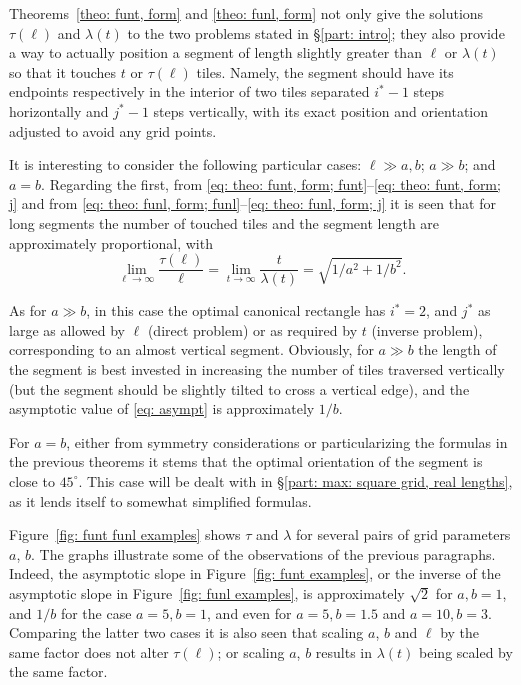\documentclass[12pt, a4paper]{article}
\newcommand{\funt}{\tau} %
\newcommand{\funl}{\lambda} %
\newcommand{\len}{\ell} %
\newcommand{\tiles}{t} %
\newcommand{\isoli}{i^\ast}
\newcommand{\jsoli}{j^\ast}
\begin{document}
Theorems~\ref{theo: funt, form} and \ref{theo: funl, form} not only give the solutions $\funt(\len)$ and $\funl(\tiles)$ to the two problems stated in \S\ref{part: intro}; they also provide a way to actually position a segment of length slightly greater than $\len$ or $\funl(\tiles)$ so that it touches $\tiles$ or $\funt(\len)$ tiles. Namely, the segment should have its endpoints respectively in the interior of two tiles separated $\isoli-1$ steps horizontally and $\jsoli-1$ steps vertically, with its exact position and orientation  adjusted to avoid any grid points.

It is interesting to consider the following particular cases: $\len \gg a,b$; $a \gg b$; and $a=b$. Regarding the first, from \eqref{eq: theo: funt, form; funt}--\eqref{eq: theo: funt, form; j}
and from \eqref{eq: theo: funl, form; funl}--\eqref{eq: theo: funl, form; j}
it is seen that for long segments the number of touched tiles and the segment length are approximately proportional, with
\begin{equation}
\label{eq: asympt}
\lim_{\len \rightarrow \infty} \frac{\funt(\len)}{\len}
= \lim_{\tiles \rightarrow \infty} \frac{\tiles}{\funl(\tiles)}
= \sqrt{1/a^2 + 1/b^2}.
\end{equation}

As for $a \gg b$, in this case the optimal canonical rectangle has $\isoli = 2$, and $\jsoli$ as large as allowed by $\len$ (direct problem) or as required by $\tiles$ (inverse problem), corresponding to an almost vertical segment. Obviously, for $a \gg b$ the length of the segment is best invested in increasing the number of tiles traversed vertically (but the segment should be slightly tilted to cross a vertical edge), and the asymptotic value of \eqref{eq: asympt} is approximately $1/b$.

For $a=b$, either from symmetry considerations or particularizing the formulas in the previous theorems it stems that the optimal orientation of the segment is close to $45^\circ$. This case will be dealt with in \S\ref{part: max: square grid, real lengths}, as it lends itself to somewhat simplified formulas.

Figure~\ref{fig: funt funl examples} shows $\funt$ and $\funl$ for several pairs of grid parameters $a$, $b$. The graphs illustrate some of the observations of the previous paragraphs. Indeed, the asymptotic slope in Figure~\ref{fig: funt examples}, or the inverse of the asymptotic slope in Figure~\ref{fig: funl examples}, is approximately $\sqrt{2}$ for $a, b=1$, and $1/b$ for the case $a=5,b=1$, and even for $a=5,b=1.5$ and $a=10,b=3$. Comparing the latter two cases it is also seen that scaling $a$, $b$ and $\len$ by the same factor does not alter $\funt(\len)$; or scaling $a$, $b$ results in $\funl(\tiles)$ being scaled by the same factor.
\end{document}
